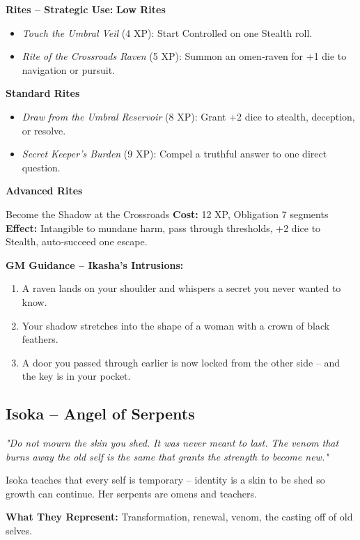 \documentclass[10pt,a5paper]{book}
\begin{document}
\textbf{Rites -- Strategic Use:}
\textbf{Low Rites}
\begin{itemize}
    \item \textit{Touch the Umbral Veil} (4 XP): Start Controlled on one Stealth roll.
    \item \textit{Rite of the Crossroads Raven} (5 XP): Summon an omen‑raven for +1 die to navigation or pursuit.
\end{itemize}
\textbf{Standard Rites}
\begin{itemize}
    \item \textit{Draw from the Umbral Reservoir} (8 XP): Grant +2 dice to stealth, deception, or resolve.
    \item \textit{Secret Keeper's Burden} (9 XP): Compel a truthful answer to one direct question.
\end{itemize}
\textbf{Advanced Rites}
\begin{patronbox}{Become the Shadow at the Crossroads}
\textbf{Cost:} 12 XP, Obligation 7 segments \\
\textbf{Effect:} Intangible to mundane harm, pass through thresholds, +2 dice to Stealth, auto‑succeed one escape.
\end{patronbox}

\textbf{GM Guidance -- Ikasha's Intrusions:}
\begin{enumerate}
    \item A raven lands on your shoulder and whispers a secret you never wanted to know.
    \item Your shadow stretches into the shape of a woman with a crown of black feathers.
    \item A door you passed through earlier is now locked from the other side -- and the key is in your pocket.
\end{enumerate}

\clearpage

\subsection{Isoka -- Angel of Serpents}
\label{patron:isoka}

\textit{"Do not mourn the skin you shed. It was never meant to last. The venom that burns away the old self is the same that grants the strength to become new."}

Isoka teaches that every self is temporary -- identity is a skin to be shed so growth can continue. Her serpents are omens and teachers.

\textbf{What They Represent:} Transformation, renewal, venom, the casting off of old selves.
\end{document}
